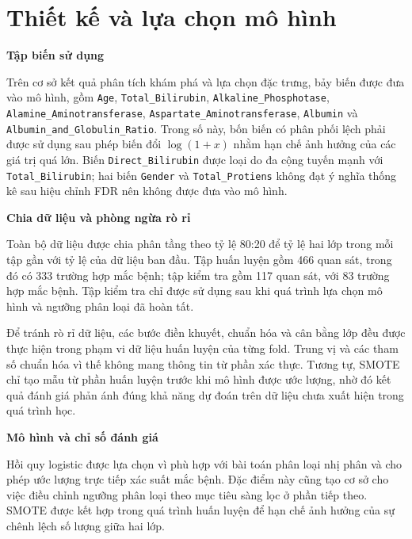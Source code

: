 \documentclass[14pt,a4paper]{extarticle}\usepackage[]{graphicx}\usepackage[]{xcolor}
\begin{document}
\section{Thiết kế và lựa chọn mô hình}

\noindent\textbf{Tập biến sử dụng}\par\smallskip

Trên cơ sở kết quả phân tích khám phá và lựa chọn đặc trưng, bảy biến được
đưa vào mô hình, gồm \texttt{Age}, \texttt{Total\_Bilirubin},
\texttt{Alkaline\_Phosphotase}, \texttt{Alamine\_Aminotransferase},
\texttt{Aspartate\_Aminotransferase}, \texttt{Albumin} và
\texttt{Albumin\_and\_Globulin\_Ratio}. Trong số này, bốn biến có phân phối
lệch phải được sử dụng sau phép biến đổi $\log(1+x)$ nhằm hạn chế ảnh hưởng
của các giá trị quá lớn. Biến \texttt{Direct\_Bilirubin} được loại do đa
cộng tuyến mạnh với \texttt{Total\_Bilirubin}; hai biến \texttt{Gender} và
\texttt{Total\_Protiens} không đạt ý nghĩa thống kê sau hiệu chỉnh FDR nên
không được đưa vào mô hình.



\medskip\noindent\textbf{Chia dữ liệu và phòng ngừa rò rỉ}\par\smallskip
\label{sec:pipeline}

Toàn bộ dữ liệu được chia phân tầng theo tỷ lệ 80:20 để tỷ lệ hai lớp trong
mỗi tập gần với tỷ lệ của dữ liệu ban đầu. Tập huấn luyện gồm 466 quan sát,
trong đó có 333 trường hợp
mắc bệnh; tập kiểm tra gồm 117 quan sát, với 83 trường hợp mắc bệnh. Tập kiểm
tra chỉ được sử dụng sau khi quá trình lựa chọn mô hình và ngưỡng phân loại
đã hoàn tất.

Để tránh rò rỉ dữ liệu, các bước điền khuyết, chuẩn hóa và cân bằng lớp đều
được thực hiện trong phạm vi dữ liệu huấn luyện của từng fold. Trung vị và
các tham số chuẩn hóa vì thế không mang thông tin từ phần xác thực. Tương tự,
SMOTE chỉ tạo mẫu từ phần huấn luyện trước khi mô hình được ước lượng,
nhờ đó kết quả đánh giá phản ánh đúng khả năng dự đoán trên dữ liệu chưa xuất
hiện trong quá trình học.

\medskip\noindent\textbf{Mô hình và chỉ số đánh giá}\par\smallskip

Hồi quy logistic được lựa chọn vì phù hợp với bài toán phân
loại nhị phân và cho phép ước lượng trực tiếp xác suất mắc bệnh. Đặc điểm này
cũng tạo cơ sở cho việc điều chỉnh ngưỡng phân loại theo mục tiêu sàng lọc ở
phần tiếp theo. SMOTE được kết hợp trong quá trình huấn luyện để hạn chế ảnh
hưởng của sự chênh lệch số lượng giữa hai lớp.
\end{document}
